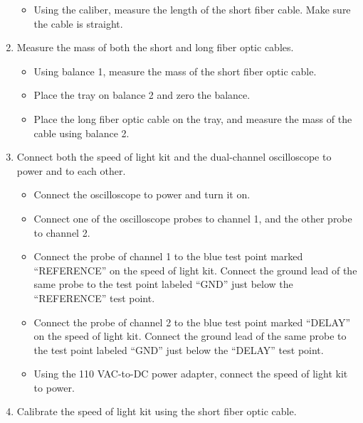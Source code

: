 \documentclass[12pt]{iopart} %
\begin{document}
\begin{enumerate}
  \begin{itemize}
  \item
    Using the caliber, measure the length of the short fiber cable. Make
    sure the cable is straight.
  \end{itemize}
\item
  Measure the mass of both the short and long fiber optic cables.

  \begin{itemize}
  \item
    Using balance 1, measure the mass of the short fiber optic cable.
  \item
    Place the tray on balance 2 and zero the balance.
  \item
    Place the long fiber optic cable on the tray, and measure the mass
    of the cable using balance 2.
  \end{itemize}
\item
  Connect both the speed of light kit and the dual-channel oscilloscope
  to power and to each other.

  \begin{itemize}
  \item
    Connect the oscilloscope to power and turn it on.
  \item
    Connect one of the oscilloscope probes to channel 1, and the other
    probe to channel 2.
  \item
    Connect the probe of channel 1 to the blue test point marked
    ``REFERENCE'' on the speed of light kit. Connect the ground lead of
    the same probe to the test point labeled ``GND'' just below the
    ``REFERENCE'' test point.
  \item
    Connect the probe of channel 2 to the blue test point marked
    ``DELAY'' on the speed of light kit. Connect the ground lead of the
    same probe to the test point labeled ``GND'' just below the
    ``DELAY'' test point.
  \item
    Using the 110 VAC-to-DC power adapter, connect the speed of light
    kit to power.
  \end{itemize}
\item
  Calibrate the speed of light kit using the short fiber optic cable.


\end{enumerate}
\end{document}
